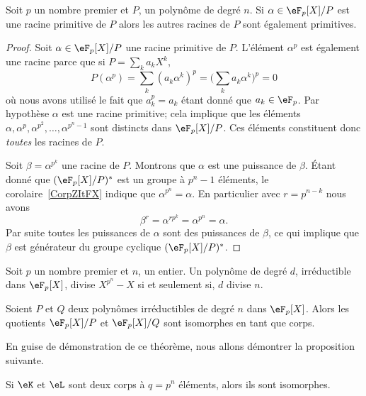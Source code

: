 \begin{lemma}       \label{Lembcerei}
	Soit \( p\) un nombre premier et \( P\), un polynôme de degré \( n\). Si \( \alpha\in \eF_p[X]/P\) est une racine primitive de \( P\) alors les autres racines de \(P\) sont également primitives.
\end{lemma}

\begin{proof}
	Soit \( \alpha\in \eF_p[X]/P\) une racine primitive de \( P\). L'élément \( \alpha^p\) est également une racine parce que si \( P=\sum_ka_kX^k\),
	\begin{equation}
		P(\alpha^p)=\sum_k(a_k\alpha^k)^p=\big( \sum_ka_k\alpha^k \big)^p=0
	\end{equation}
	où nous avons utilisé le fait que \( a_k^p=a_k\) étant donné que \( a_k\in\eF_p\). Par hypothèse \( \alpha\) est une racine primitive; cela implique que les éléments \( \alpha,\alpha^p,\alpha^{p^2},\ldots,\alpha^{p^n-1}\) sont distincts dans \( \eF_p[X]/P\). Ces éléments constituent donc \emph{toutes} les racines de \( P\).

	Soit \( \beta=\alpha^{p^k}\) une racine de \( P\). Montrons que \( \alpha\) est une puissance de \( \beta\). Étant donné que \( (\eF_p[X]/P)^*\) est un groupe à \( p^n-1\) éléments, le corolaire~\ref{CorpZItFX} indique que \( \alpha^{p^n}=\alpha\). En particulier avec \( r=p^{n-k}\) nous avons
	\begin{equation}
		\beta^r=\alpha^{rp^k}=\alpha^{p^n}=\alpha.
	\end{equation}
	Par suite toutes les puissances de \( \alpha\) sont des puissances de \( \beta\), ce qui implique que \( \beta\) est générateur du groupe cyclique \( (\eF_p[X]/P)^*\).
\end{proof}

\begin{lemma}       \label{LemkzWjse}
	Soit \( p\) un nombre premier et \( n\), un entier. Un polynôme de degré \( d\), irréductible dans \( \eF_p[X]\), divise \( X^{p^n}-X\) si et seulement si, \( d\) divise \( n\).
\end{lemma}

\begin{theorem}
	Soient \( P\) et \( Q\) deux polynômes irréductibles de degré \( n\) dans \( \eF_p[X]\). Alors les quotients \( \eF_p[X]/P\) et \( \eF_p[X]/Q\) sont isomorphes en tant que corps.
\end{theorem}
En guise de démonstration de ce théorème, nous allons démontrer la proposition suivante.
\begin{proposition}      \label{PropCRPjZsp}
	Si \( \eK\) et \( \eL\) sont deux corps à \( q=p^n\) éléments, alors ils sont isomorphes.
\end{proposition}

